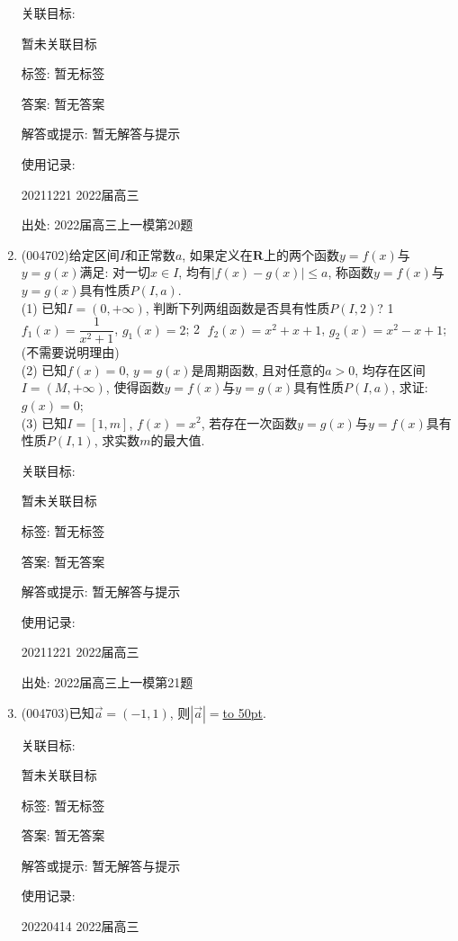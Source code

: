 \documentclass[10pt,a4paper]{article}
\newcommand{\blank}[1]{\underline{\hbox to #1pt{}}}
\begin{document}
\begin{enumerate}[1.]
关联目标:

暂未关联目标



标签: 暂无标签

答案: 暂无答案

解答或提示: 暂无解答与提示

使用记录:

20211221	2022届高三			


出处: 2022届高三上一模第20题
\item { (004702)}给定区间$I$和正常数$a$, 如果定义在$\mathbf{R}$上的两个函数$y=f(x)$与$y=g(x)$满足: 对一切$x\in I$, 均有$|f(x)-g(x)|\le a$, 称函数$y=f(x)$与$y=g(x)$具有性质$P(I,a)$.\\
(1)	已知$I=(0,+\infty)$, 判断下列两组函数是否具有性质$P(I,2)$? \textcircled{1} $f_1(x)=\dfrac 1{{x^2}+1}$, $g_1(x)=2$; \textcircled{2} $f_2(x)=x^2+x+1$, $g_2(x)=x^2-x+1$;(不需要说明理由)\\
(2)	已知$f(x)=0$, $y=g(x)$是周期函数, 且对任意的$a>0$, 均存在区间$I=(M,+\infty)$, 使得函数$y=f(x)$与$y=g(x)$具有性质$P(I,a)$, 求证: $g(x)=0$;\\
(3)	已知$I=[1,m]$, $f(x)=x^2$, 若存在一次函数$y=g(x)$与$y=f(x)$具有性质$P(I,1)$, 求实数$m$的最大值.


关联目标:

暂未关联目标



标签: 暂无标签

答案: 暂无答案

解答或提示: 暂无解答与提示

使用记录:

20211221	2022届高三			


出处: 2022届高三上一模第21题
\item { (004703)}已知$\overrightarrow a = (-1,1)$, 则$|\overrightarrow a|=$\blank{50}.


关联目标:

暂未关联目标



标签: 暂无标签

答案: 暂无答案

解答或提示: 暂无解答与提示

使用记录:

20220414	2022届高三	



\end{enumerate}
\end{document}
